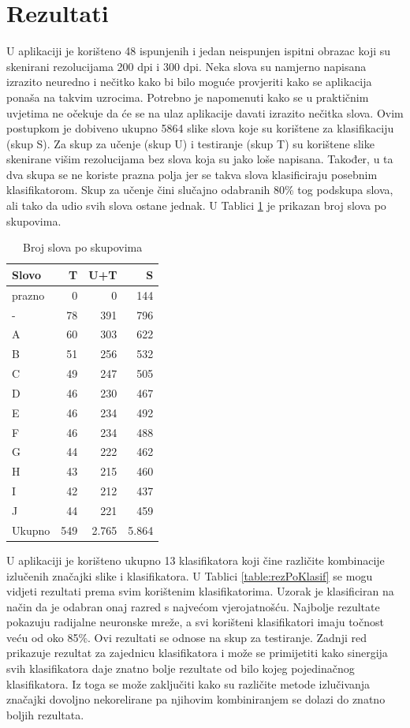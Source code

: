 \documentclass[a4paper,twocolumn,dvipdfm]{article}
\begin{document}
\section{Rezultati}
U aplikaciji je korišteno 48 ispunjenih i jedan neispunjen ispitni obrazac koji
su skenirani rezolucijama 200 dpi i 300 dpi. Neka slova su namjerno napisana
izrazito neuredno i nečitko kako bi bilo moguće provjeriti kako se aplikacija
ponaša na takvim uzrocima. Potrebno je napomenuti kako se u praktičnim uvjetima
ne očekuje da će se na ulaz aplikacije davati izrazito nečitka slova. Ovim
postupkom je dobiveno ukupno 5864 slike slova koje su korištene za klasifikaciju
(skup S). Za skup za učenje (skup U) i testiranje (skup T) su korištene slike
skenirane višim rezolucijama bez slova koja su jako loše napisana. Također,
u ta dva skupa se ne koriste prazna polja jer se takva slova klasificiraju
posebnim klasifikatorom. Skup za učenje čini slučajno odabranih 80\% tog
podskupa slova, ali tako da udio svih slova ostane jednak. U Tablici
\ref{table:brojSlova} je prikazan broj slova po skupovima.

\begin{table}[htb]
\centering
\begin{tabular}{lrrr} \toprule
Slovo & T & U+T & S \\ \midrule
prazno & 0 & 0 & 144 \\
- & 78 & 391 & 796 \\
A & 60 & 303 & 622 \\
B & 51 & 256 & 532 \\
C & 49 & 247 & 505 \\
D & 46 & 230 & 467 \\
E & 46 & 234 & 492 \\
F & 46 & 234 & 488 \\
G & 44 & 222 & 462 \\
H & 43 & 215 & 460 \\
I & 42 & 212 & 437 \\
J & 44 & 221 & 459 \\ \midrule
Ukupno & 549 & 2.765 & 5.864 \\ \bottomrule
\end{tabular}
\caption{Broj slova po skupovima}
\label{table:brojSlova}
\end{table}

U aplikaciji je korišteno ukupno 13 klasifikatora koji čine različite
kombinacije izlučenih značajki slike i klasifikatora. U Tablici
\ref{table:rezPoKlasif} se mogu vidjeti rezultati prema svim korištenim
klasifikatorima. Uzorak je klasificiran na način da je odabran onaj razred s
najvećom vjerojatnošću. Najbolje rezultate pokazuju radijalne neuronske mreže, a
svi korišteni klasifikatori imaju točnost veću od oko 85\%. Ovi rezultati se
odnose na skup za testiranje. Zadnji red prikazuje rezultat za zajednicu
klasifikatora i može se primijetiti kako sinergija svih klasifikatora daje
znatno bolje rezultate od bilo kojeg pojedinačnog klasifikatora. Iz toga se može
zaključiti kako su različite metode izlučivanja značajki dovoljno nekorelirane
pa njihovim kombiniranjem se dolazi do znatno boljih rezultata.
\end{document}
